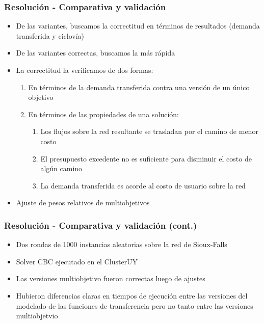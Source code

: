 \documentclass[aspectratio=43, 10pt]{beamer}
\begin{document}
\begin{frame}
    \frametitle{Resolución - Comparativa y validación}

    \begin{itemize}
        \item{De las variantes, buscamos la correctitud en términos de resultados (demanda transferida y ciclovía)}
        \item{De las variantes correctas, buscamos la más rápida}
        \item{La correctitud la verificamos de dos formas:
             \begin{enumerate}
                \item{En términos de la demanda transferida contra una versión de un único objetivo}
                \item{En términos de las propiedades de una solución:
                    \begin{enumerate}
                        \item{Los flujos sobre la red resultante se trasladan por el camino de menor costo}
                        \item{El presupuesto excedente no es suficiente para disminuir el costo de algún camino}
                        \item{La demanda transferida es acorde al costo de usuario sobre la red}
                    \end{enumerate}
                }
            \end{enumerate}
        }
    \item{Ajuste de pesos relativos de multiobjetivos}
    \end{itemize}
\end{frame}

\begin{frame}
    \frametitle{Resolución - Comparativa y validación (cont.)}

    \begin{itemize}
        \item{Dos rondas de 1000 instancias aleatorias sobre la red de Sioux-Falls}
        \item{Solver CBC ejecutado en el ClusterUY}
        \item{Las versiones multiobjetivo fueron correctas luego de ajustes}
        \item{Hubieron diferencias claras en tiempos de ejecución entre las versiones
            del modelado de las funciones de transferencia pero no tanto entre las
            versiones multiobjetvio}
    \end{itemize}
\end{frame}
\end{document}
